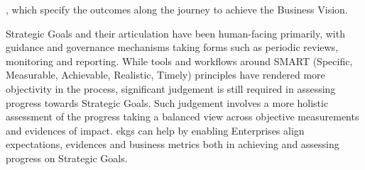 \textbf{}, which specify the outcomes along the journey to achieve the
Business Vision.

Strategic Goals and their articulation have been human-facing primarily, with guidance and governance mechanisms
taking forms such as periodic reviews, monitoring and reporting.
While tools and workflows around SMART (Specific, Measurable, Achievable, Realistic, Timely) principles have
rendered more objectivity in the process, significant judgement is still required in assessing progress towards
Strategic Goals.
Such judgement involves a more holistic assessment of the progress taking a balanced view across objective measurements
and evidences of impact.
\Glspl{ekg} can help by enabling Enterprises align expectations, evidences and business metrics both in achieving
and assessing progress on Strategic Goals.